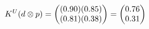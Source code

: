 \documentclass[preview]{standalone}
\begin{document}
\begin{align*}
\special{dvisvgm:raw <g id='unique000'>}K^U(d \otimes p) = \begin{pmatrix} (0.90)(0.85) \\ (0.81)(0.38) \end{pmatrix} = \begin{pmatrix} 0.76 \\ 0.31 \end{pmatrix}\special{dvisvgm:raw </g>}
\end{align*}
\end{document}
